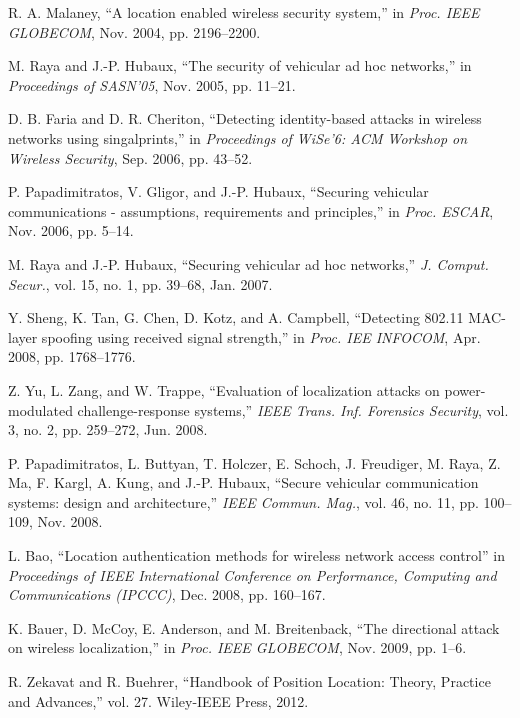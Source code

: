 \documentclass[journal]{IEEEtran}
\begin{document}
\begin{thebibliography}{1}

 R. A. Malaney, ``A location enabled wireless security system,'' in \textit{Proc. IEEE GLOBECOM}, Nov. 2004, pp. 2196--2200.

 M. Raya and J.-P. Hubaux, ``The security of vehicular ad hoc networks,'' in \emph{Proceedings of SASN'05}, Nov. 2005, pp. 11--21.

 D. B. Faria and D. R. Cheriton, ``Detecting identity-based attacks in wireless networks using singalprints,'' in \emph{Proceedings of WiSe'6: ACM Workshop on Wireless Security}, Sep. 2006, pp. 43--52.

 P. Papadimitratos, V. Gligor, and J.-P. Hubaux, ``Securing vehicular communications - assumptions, requirements and principles,'' in \emph{Proc. ESCAR}, Nov. 2006, pp. 5--14.

 M. Raya and J.-P. Hubaux, ``Securing vehicular ad hoc networks,'' \emph{J. Comput. Secur.}, vol. 15, no. 1, pp. 39--68, Jan. 2007.

 Y. Sheng, K. Tan, G. Chen, D. Kotz, and A. Campbell, ``Detecting 802.11 MAC-layer spoofing using received signal strength,'' in \emph{Proc. IEE INFOCOM}, Apr. 2008, pp. 1768--1776.

 Z. Yu, L. Zang, and W. Trappe, ``Evaluation of localization attacks on power-modulated challenge-response systems,'' \textit{IEEE Trans. Inf. Forensics Security}, vol. 3, no. 2, pp. 259--272, Jun. 2008.

 P. Papadimitratos, L. Buttyan, T. Holczer, E. Schoch, J. Freudiger, M. Raya, Z. Ma, F. Kargl, A. Kung, and J.-P. Hubaux, ``Secure vehicular communication systems: design and architecture,'' \emph{IEEE Commun. Mag.}, vol. 46, no. 11, pp. 100--109, Nov. 2008.

 L. Bao, ``Location authentication methods for wireless network access control'' in \emph{Proceedings of IEEE International Conference on Performance, Computing and Communications (IPCCC)}, Dec. 2008, pp. 160--167.

 K. Bauer, D. McCoy, E. Anderson, and M. Breitenback, ``The directional attack on wireless localization,'' in \emph{Proc. IEEE GLOBECOM}, Nov. 2009, pp. 1--6.

 R. Zekavat and R. Buehrer, ``Handbook of Position Location: Theory, Practice and Advances,'' vol. 27. Wiley-IEEE Press, 2012.


\end{thebibliography}
\end{document}
